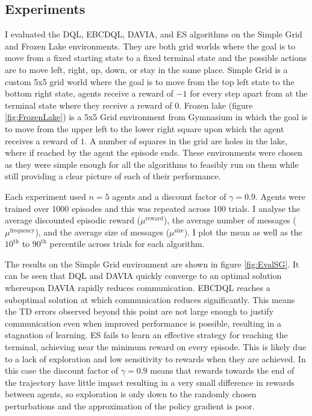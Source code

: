 \subsection{Experiments}
I evaluated the DQL, EBCDQL, DAVIA, and ES algorithms on the Simple Grid and Frozen Lake environments. They are both grid worlds where the goal is to move from a fixed starting state to a fixed terminal state and the possible actions are to move left, right, up, down, or stay in the same place. Simple Grid is a custom 5x5 grid world where the goal is to move from the top left state to the bottom right state, agents receive a reward of $-1$ for every step apart from at the terminal state where they receive a reward of $0$. Frozen lake (figure \ref{fig:FrozenLake}) is a 5x5 Grid environment from Gymnasium in which the goal is to move from the upper left to the lower right square upon which the agent receives a reward of $1$. A number of squares in the grid are holes in the lake, where if reached by the agent the episode ends. These environments were chosen as they were simple enough for all the algorithms to feasibly run on them while still providing a clear picture of each of their performance.

Each experiment used $n=5$ agents and a discount factor of $\gamma=0.9$. Agents were trained over 1000 episodes and this was repeated across 100 trials. I analyse the average discounted episodic reward ($\mu^{\text{reward}}$), the average number of messages ($\mu^{\text{frequency}}$), and the average size of messages ($\mu^{\text{size}}$). I plot the mean as well as the $10^{\text{th}}$ to $90^{\text{th}}$ percentile across trials for each algorithm.

The results on the Simple Grid environment are shown in figure \ref{fig:EvalSG}. It can be seen that DQL and DAVIA quickly converge to an optimal solution whereupon DAVIA rapidly reduces communication. EBCDQL reaches a suboptimal solution at which communication reduces significantly. This means the TD errors observed beyond this point are not large enough to justify communication even when improved performance is possible, resulting in a stagnation of learning. ES fails to learn an effective strategy for reaching the terminal, achieving near the minimum reward on every episode. This is likely due to a lack of exploration and low sensitivity to rewards when they are achieved. In this case the discount factor of $\gamma=0.9$ means that rewards towards the end of the trajectory have little impact resulting in a very small difference in rewards between agents, so exploration is only down to the randomly chosen perturbations and the approximation of the policy gradient is poor.

